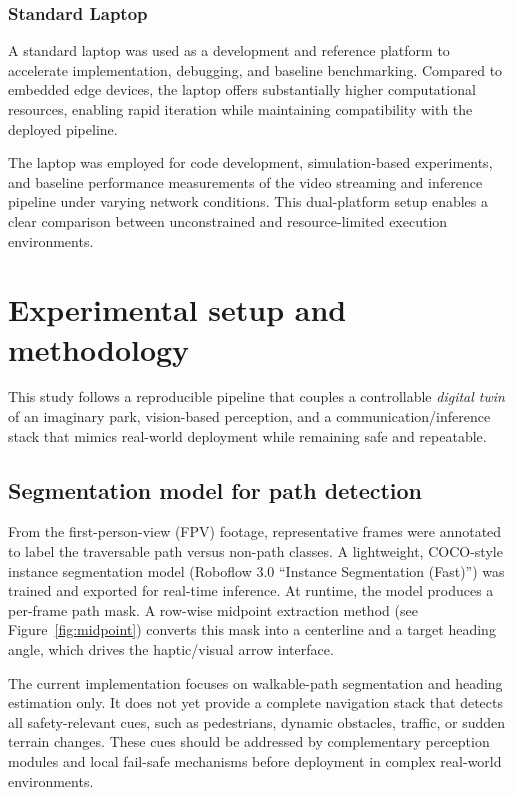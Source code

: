 \documentclass{ieeeaccess}
\begin{document}
\subsubsection{Standard Laptop}
\label{sec:laptop}

A standard laptop was used as a development and reference platform to accelerate implementation, debugging, and baseline benchmarking. Compared to embedded edge devices, the laptop offers substantially higher computational resources, enabling rapid iteration while maintaining compatibility with the deployed pipeline.

The laptop was employed for code development, simulation-based experiments, and baseline performance measurements of the video streaming and inference pipeline under varying network conditions. This dual-platform setup enables a clear comparison between unconstrained and resource-limited execution environments.

\section{Experimental setup and methodology}
This study follows a reproducible pipeline that couples a controllable \emph{digital twin} of an imaginary park, vision-based perception, and a communication/inference stack that mimics real-world deployment while remaining safe and repeatable.

\subsection{Segmentation model for path detection}
From the first-person-view (FPV) footage, representative frames were annotated to label the traversable path versus non-path classes. A lightweight, COCO-style instance segmentation model (Roboflow 3.0 “Instance Segmentation (Fast)”) \cite{roboflow_models} was trained and exported for real-time inference. At runtime, the model produces a per-frame path mask. A row-wise midpoint extraction method (see Figure~\ref{fig:midpoint}) converts this mask into a centerline and a target heading angle, which drives the haptic/visual arrow interface.

The current implementation focuses on walkable-path segmentation and heading estimation only. It does not yet provide a complete navigation stack that detects all safety-relevant cues, such as pedestrians, dynamic obstacles, traffic, or sudden terrain changes. These cues should be addressed by complementary perception modules and local fail-safe mechanisms before deployment in complex real-world environments.
\end{document}
